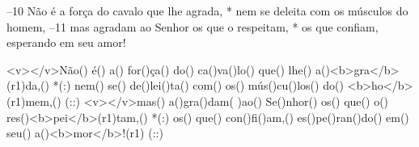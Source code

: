 –10 Não é a força do cavalo que lhe agrada, *
nem se deleita com os músculos do homem,
–11 mas agradam ao Senhor os que o respeitam, *
os que confiam, esperando em seu amor!

<v></v>Não() é() a() for()ça() do() ca()va()lo() que() lhe() a()<b>gra</b>(r1)da,() *(:)
nem() se() de()lei()ta() com() os() mús()cu()los() do() <b>ho</b>(r1)mem,() (::)
<v></v>mas() a()gra()dam( )ao() Se()nhor() os() que() o() res()<b>pei</b>(r1)tam,() *(:)
os() que() con()fi()am,() es()pe()ran()do() em() seu() a()<b>mor</b>!(r1) (::)